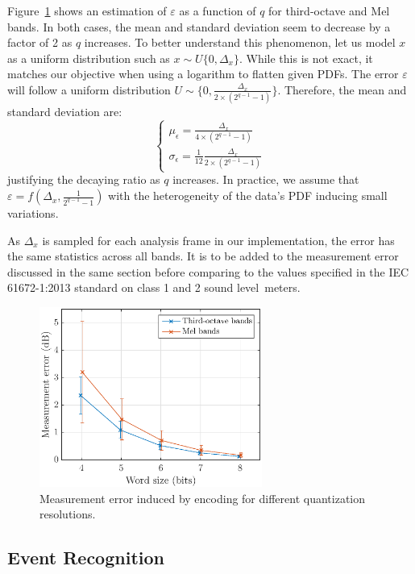 \documentclass[sensors,article,accept,moreauthors,pdftex,10pt,a4paper]{mdpi}
\begin{document}
Figure~\ref{fig:error_q} shows an estimation of $\varepsilon$ as a function of $q$ for third-octave and Mel bands. In both cases, the mean and standard deviation seem to decrease by a factor of 2 as $q$ increases. To better understand this phenomenon, let us model $x$ as a uniform distribution such as $x\sim \textit{U}\{0, \Delta_x\}$. While this is not {exact,} it matches our objective when using a logarithm to flatten given PDFs. The error $\varepsilon$ will follow a uniform distribution $U\sim \{0, \frac{\Delta_x}{2\times (2^{q-1}-1)}\}$. Therefore, the mean and standard deviation are:
\[
\begin{cases}
	\mu_\epsilon = \frac{\Delta_x}{4\times (2^{q-1}-1)}\\
	\sigma_\epsilon = \frac{1}{12}\frac{\Delta_x}{2\times (2^{q-1}-1)}
\end{cases}
\]
justifying the decaying ratio as $q$ increases. In practice, we assume that $\varepsilon = f(\Delta_x, \frac{1}{2^{q-1}-1})$ with the heterogeneity of the data's PDF inducing small variations.

As $\Delta_x$ is sampled for each analysis frame in our implementation, the error has the same statistics across all bands. It is to be added to the measurement error discussed in the same section before comparing to the values specified in the IEC 61672-1:2013 \cite{iec-norm2} standard on class 1 and 2 sound \mbox{level meters.}

\begin{figure}[H]
	\centering
		\includegraphics[width=0.65\textwidth]{figures/error_qall.eps}
	\caption{Measurement error induced by encoding for different quantization resolutions.}
	\label{fig:error_q}
\end{figure}



\subsection{Event Recognition} \label{sec:event_r}
\end{document}
